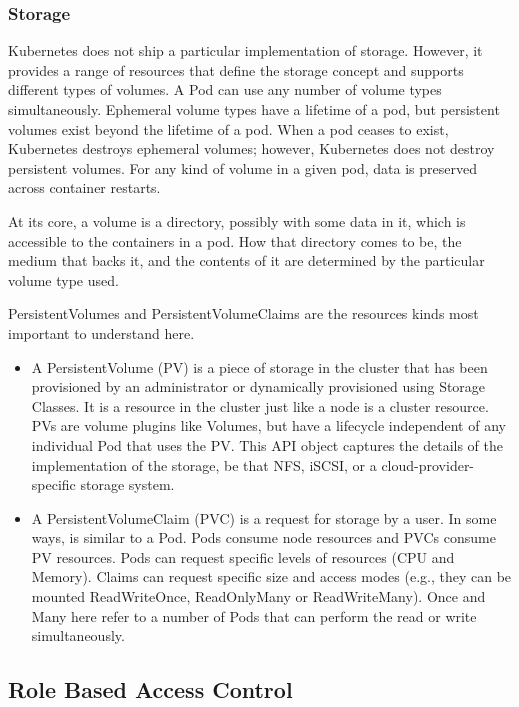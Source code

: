 \subsubsection*{Storage}

Kubernetes does not ship a particular implementation of storage. However, it provides a range of resources that define the storage concept and supports different types of volumes. A Pod can use any number of volume types simultaneously. Ephemeral volume types have a lifetime of a pod, but persistent volumes exist beyond the lifetime of a pod. When a pod ceases to exist, Kubernetes destroys ephemeral volumes; however, Kubernetes does not destroy persistent volumes. For any kind of volume in a given pod, data is preserved across container restarts.

At its core, a volume is a directory, possibly with some data in it, which is accessible to the containers in a pod. How that directory comes to be, the medium that backs it, and the contents of it are determined by the particular volume type used.

PersistentVolumes and PersistentVolumeClaims are the resources kinds most important to understand here.
\begin{itemize}
\item A PersistentVolume (PV) is a piece of storage in the cluster that has been provisioned by an administrator or dynamically provisioned using Storage Classes. It is a resource in the cluster just like a node is a cluster resource. PVs are volume plugins like Volumes, but have a lifecycle independent of any individual Pod that uses the PV. This API object captures the details of the implementation of the storage, be that NFS, iSCSI, or a cloud-provider-specific storage system.
\item A PersistentVolumeClaim (PVC) is a request for storage by a user. In some ways, is similar to a Pod. Pods consume node resources and PVCs consume PV resources. Pods can request specific levels of resources (CPU and Memory). Claims can request specific size and access modes (e.g., they can be mounted ReadWriteOnce, ReadOnlyMany or ReadWriteMany). Once and Many here refer to a number of Pods that can perform the read or write simultaneously.
\end{itemize}

\subsection{Role Based Access Control}

